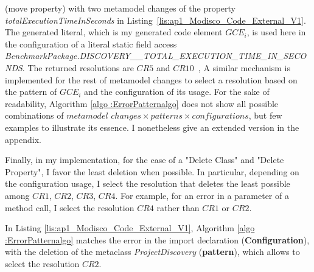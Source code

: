  (move property) with two metamodel changes of the property \emph{totalExecutionTimeInSeconds} in Listing~\ref{lis:ap1_Modisco_Code_External_V1}. The generated literal, which is my generated code element $GCE_i$, is used here in the configuration of a literal static field access 
\emph{\footnotesize{BenchmarkPackage.DISCOVERY\_\_TOTAL\_EXECUTION\_TIME\_IN\_SECONDS}}. The returned resolutions are $CR5$ and $CR10$~{\small{}}, 
A similar mechanism is implemented for the rest of metamodel changes to select a resolution based on the pattern of $GCE_i$ and the configuration of its usage. %
For the sake of readability, Algorithm \ref{algo :ErrorPatternalgo} does not show all possible combinations of $metamodel$ $changes \times patterns \times configurations$, but few examples to illustrate its essence. I nonetheless give an extended version in the appendix.

%
Finally, in my implementation, for the case of a "Delete Class" and "Delete Property", I favor the least deletion when possible. In particular, depending on the configuration usage, I select the resolution that deletes the least possible among $CR1$, $CR2$, $CR3$, $CR4$. For example, for an error in a parameter of a method call, I select the resolution $CR4$ rather than $CR1$ or $CR2$. 


In Listing \ref{lis:ap1_Modisco_Code_External_V1}, Algorithm \ref{algo :ErrorPatternalgo} matches the error in the import declaration (\textbf{Configuration}), with the deletion of the metaclass \textit{ProjectDiscovery} (\textbf{pattern}), which allows to select the resolution $CR2$.







